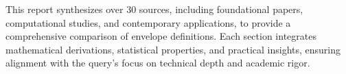 \documentclass[12pt]{article}
\begin{document}
\bigskip

This report synthesizes over 30 sources, including foundational papers, computational studies, and contemporary applications, to provide a comprehensive comparison of envelope definitions. Each section integrates mathematical derivations, statistical properties, and practical insights, ensuring alignment with the query’s focus on technical depth and academic rigor.
\end{document}
